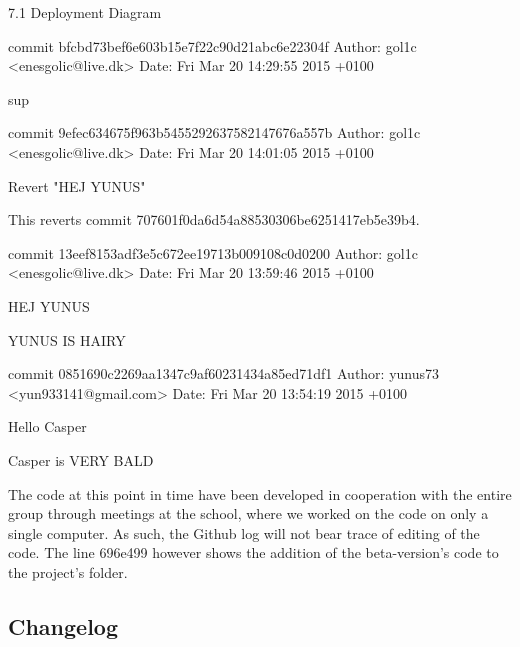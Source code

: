 \documentclass[12pt,a4paper]{article}
\begin{document}
7.1 Deployment Diagram

commit bfcbd73bef6e603b15e7f22c90d21abc6e22304f
Author: gol1c <enesgolic@live.dk>
Date:   Fri Mar 20 14:29:55 2015 +0100

sup

commit 9efec634675f963b5455292637582147676a557b
Author: gol1c <enesgolic@live.dk>
Date:   Fri Mar 20 14:01:05 2015 +0100

Revert "HEJ YUNUS"

This reverts commit 707601f0da6d54a88530306be6251417eb5e39b4.

commit 13eef8153adf3e5c672ee19713b009108c0d0200
Author: gol1c <enesgolic@live.dk>
Date:   Fri Mar 20 13:59:46 2015 +0100

HEJ YUNUS

YUNUS IS HAIRY

commit 0851690c2269aa1347c9af60231434a85ed71df1
Author: yunus73 <yun933141@gmail.com>
Date:   Fri Mar 20 13:54:19 2015 +0100

Hello Casper

Casper is VERY BALD


\noindent\makebox[\linewidth]{\rule{16.5cm}{0.4pt}}

The code at this point in time have been developed in cooperation with the entire group through meetings at the school, where we worked on the code on only a single computer. As such, the Github log will not bear trace of editing of the code. The line 696e499 however shows the addition of the beta-version's code to the project's folder.
\newpage
\subsection{Changelog}
\end{document}
